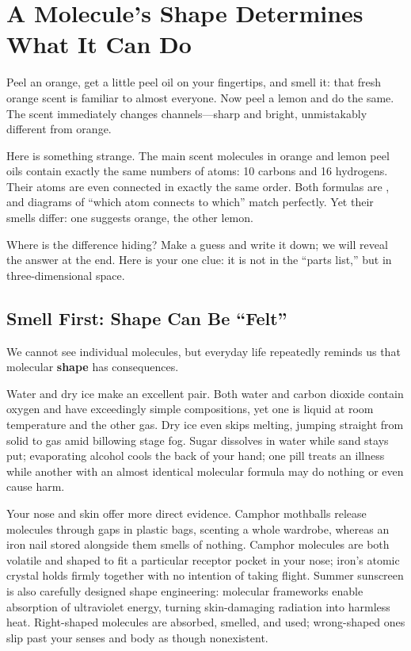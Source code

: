 \chapter{A Molecule's Shape Determines What It Can Do}

\begin{kaichang}
Peel an orange, get a little peel oil on your fingertips, and smell it: that fresh orange scent is familiar to almost everyone. Now peel a lemon and do the same. The scent immediately changes channels---sharp and bright, unmistakably different from orange.

Here is something strange. The main scent molecules in orange and lemon peel oils contain exactly the same numbers of atoms: 10 carbons and 16 hydrogens. Their atoms are even connected in exactly the same order. Both formulas are , and diagrams of ``which atom connects to which'' match perfectly. Yet their smells differ: one suggests orange, the other lemon.

Where is the difference hiding? Make a guess and write it down; we will reveal the answer at the end. Here is your one clue: it is not in the ``parts list,'' but in three-dimensional space.
\end{kaichang}

\section{Smell First: Shape Can Be ``Felt''}

We cannot see individual molecules, but everyday life repeatedly reminds us that molecular \textbf{shape} has consequences.

Water and dry ice make an excellent pair. Both water and carbon dioxide contain oxygen and have exceedingly simple compositions, yet one is liquid at room temperature and the other gas. Dry ice even skips melting, jumping straight from solid to gas amid billowing stage fog. Sugar dissolves in water while sand stays put; evaporating alcohol cools the back of your hand; one pill treats an illness while another with an almost identical molecular formula may do nothing or even cause harm.

Your nose and skin offer more direct evidence. Camphor mothballs release molecules through gaps in plastic bags, scenting a whole wardrobe, whereas an iron nail stored alongside them smells of nothing. Camphor molecules are both volatile and shaped to fit a particular receptor pocket in your nose; iron's atomic crystal holds firmly together with no intention of taking flight. Summer sunscreen is also carefully designed shape engineering: molecular frameworks enable absorption of ultraviolet energy, turning skin-damaging radiation into harmless heat. Right-shaped molecules are absorbed, smelled, and used; wrong-shaped ones slip past your senses and body as though nonexistent.

